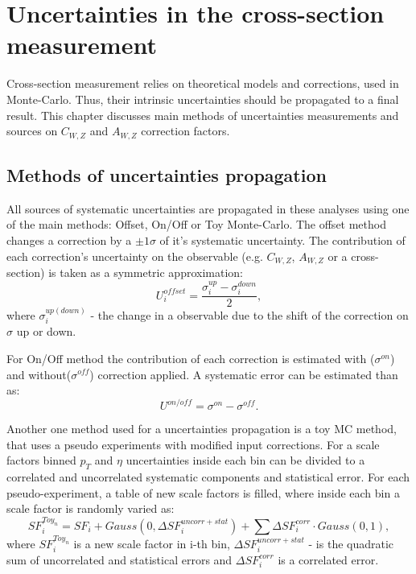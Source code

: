 \chapter{Uncertainties in the cross-section measurement}\label{chap:Unc}
\minitoc
Cross-section measurement relies on theoretical models and corrections, used in Monte-Carlo. Thus, their intrinsic uncertainties should be propagated to a final result. This chapter discusses main methods of uncertainties measurements and sources on $C_{W,Z}$ and $A_{W,Z}$ correction factors. 

\section{Methods of uncertainties propagation}
All sources of systematic uncertainties are propagated in these analyses using one of the main methods: Offset, On/Off or Toy Monte-Carlo. The offset method changes a correction by a $\pm 1\sigma$ of it's systematic uncertainty. The contribution of each correction's uncertainty on the observable (e.g. $C_{W,Z}$, $A_{W,Z}$ or a cross-section) is taken as a symmetric approximation:
\begin{equation}
U_i^{offset}=\frac{\sigma_{i}^{up}-\sigma_{i}^{down}}{2},
\end{equation}
where $\sigma_{i}^{up(down)}$ - the change in a observable due to the shift of the correction on $\sigma$ up or down. 

For On/Off method the contribution of each correction is estimated with ($\sigma^{on}$) and without($\sigma^{off}$) correction applied. A systematic error can be estimated than as:
\begin{equation}
U^{on/off}=\sigma^{on}-\sigma^{off}.
\end{equation}

Another one method used for a uncertainties propagation is a toy MC method, that uses a pseudo experiments with modified input corrections. For a scale factors binned $p_T$ and $\eta$ uncertainties inside each bin can be divided to a correlated  and uncorrelated systematic components and statistical error. For each pseudo-experiment, a table of new scale factors is filled, where inside each bin a scale factor is randomly varied as:
\begin{equation}\label{eq:ToyMethod}
SF_{i}^{Toy_{n}} = SF_{i}+ Gauss(0,\Delta SF_{i} ^{uncorr+stat}) + \sum \Delta SF_{i} ^{corr} \cdot Gauss(0, 1),
\end{equation}
where $SF_{i}^{Toy_{n}}$ is a new scale factor in i-th bin, $\Delta SF_{i} ^{uncorr+stat}$ - is the quadratic sum of uncorrelated and statistical errors and $\Delta SF_{i} ^{corr}$ is a correlated error.

